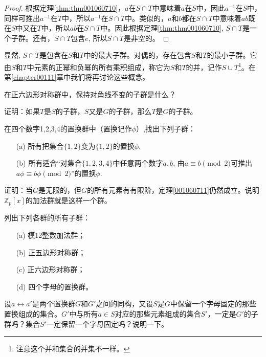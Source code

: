 \begin{proof}
根据定理\ref{thm:thm001060710}，$a$在$S \cap T$中意味着$a$在$S$中，因此$a^{-1}$在$S$中，同样可推出$a^{-1}$在$T$中，所以$a^{-1}$在$S \cap T$中。类似的，$a$和$b$都在$S \cap T$中意味着$ab$既在$S$中又在$T$中，所以$ab$在$S \cap T$中。因此根据定理\ref{thm:thm001060710}, $S \cap T$是一个子群。还有，$S \cap T$包含$e$, 所以$S \cap T$是非空的。
\end{proof}

显然, $S \cap T$是包含在$S$和$T$中的最大子群。对偶的，存在包含$S$和$T$的最小子群。它由$S$和$T$中元素的正幂和负幂的所有乘积组成，称它为$S$和$T$的并，记作$S \cup T$\footnote{注意这个并和集合的并集不一样。}。在第\ref{chapter00111}章中我们将再讨论这些概念。

\begin{problemset}
\item 在正六边形对称群中，保持对角线不变的子群是什么？

\item 证明：如果$T$是$S$的子群，$S$又是$G$的子群，那么$T$是$G$的子群。

\item 在四个数字1,2,3,4的置换群中（置换记作$\phi$）,找出下列子群：
\begin{enumerate}
\item[(a)] 所有把集合$\{1,2\}$变为$\{1,2\}$的置换$\phi$.
\item[(b)] 所有适合“对集合$\{1,2,3,4\}$中任意两个数字$a,b$, 由$a \equiv b \pmod{2}$可推出$a\phi \equiv b\phi \pmod{2}$”的置换$\phi$.
\end{enumerate}

\item 证明：当$G$是无限的，但$G$的所有元素有有限阶，定理\ref{001060711}仍然成立。说明$\mathbb{Z}_p[x]$的加法群就是这样一个群。

\item 列出下列各群的所有子群：
\begin{enumerate}
\item[(a)] 模12整数加法群；
\item[(b)] 正五边形对称群；
\item[(c)] 正六边形对称群；
\item[(d)] 四个字母的置换群。
\end{enumerate}

\item 设$a \leftrightarrow a'$是两个置换群$G$和$G'$之间的同构，又设$S$是$G$中保留一个字母固定的那些置换组成的集合。$G'$中与所有$a \in S$对应的那些元素组成的集合$S'$，一定是$G'$的子群吗？集合$S'$一定保留一个字母固定吗？说明一下。


\end{problemset}
